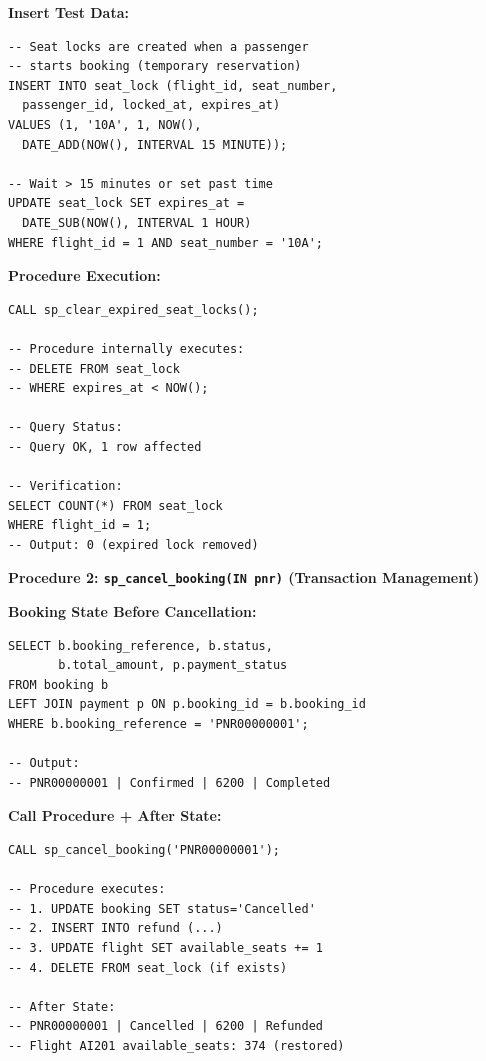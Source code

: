 \documentclass[12pt, a4paper]{article}
\begin{document}
\noindent\begin{minipage}[t]{0.48\textwidth}
\textbf{Insert Test Data:}
\begin{lstlisting}[style=sqlstyle,basicstyle=\tiny\ttfamily,showstringspaces=false]
-- Seat locks are created when a passenger
-- starts booking (temporary reservation)
INSERT INTO seat_lock (flight_id, seat_number, 
  passenger_id, locked_at, expires_at)
VALUES (1, '10A', 1, NOW(), 
  DATE_ADD(NOW(), INTERVAL 15 MINUTE));

-- Wait > 15 minutes or set past time
UPDATE seat_lock SET expires_at = 
  DATE_SUB(NOW(), INTERVAL 1 HOUR) 
WHERE flight_id = 1 AND seat_number = '10A';
\end{lstlisting}
\end{minipage}\hfill
\begin{minipage}[t]{0.48\textwidth}
\textbf{Procedure Execution:}
\begin{lstlisting}[style=sqlstyle,basicstyle=\tiny\ttfamily,showstringspaces=false]
CALL sp_clear_expired_seat_locks();

-- Procedure internally executes:
-- DELETE FROM seat_lock 
-- WHERE expires_at < NOW();

-- Query Status:
-- Query OK, 1 row affected

-- Verification:
SELECT COUNT(*) FROM seat_lock 
WHERE flight_id = 1;
-- Output: 0 (expired lock removed)
\end{lstlisting}
\end{minipage}

\vspace{0.3cm}

\textbf{Procedure 2: \texttt{sp\_cancel\_booking(IN pnr)} (Transaction Management)}

\noindent\begin{minipage}[t]{0.48\textwidth}
\textbf{Booking State Before Cancellation:}
\begin{lstlisting}[style=sqlstyle,basicstyle=\tiny\ttfamily,showstringspaces=false]
SELECT b.booking_reference, b.status, 
       b.total_amount, p.payment_status
FROM booking b
LEFT JOIN payment p ON p.booking_id = b.booking_id
WHERE b.booking_reference = 'PNR00000001';

-- Output:
-- PNR00000001 | Confirmed | 6200 | Completed
\end{lstlisting}
\end{minipage}\hfill
\begin{minipage}[t]{0.48\textwidth}
\textbf{Call Procedure + After State:}
\begin{lstlisting}[style=sqlstyle,basicstyle=\tiny\ttfamily,showstringspaces=false]
CALL sp_cancel_booking('PNR00000001');

-- Procedure executes:
-- 1. UPDATE booking SET status='Cancelled'
-- 2. INSERT INTO refund (...)
-- 3. UPDATE flight SET available_seats += 1
-- 4. DELETE FROM seat_lock (if exists)

-- After State:
-- PNR00000001 | Cancelled | 6200 | Refunded
-- Flight AI201 available_seats: 374 (restored)
\end{lstlisting}
\end{minipage}
\end{document}
